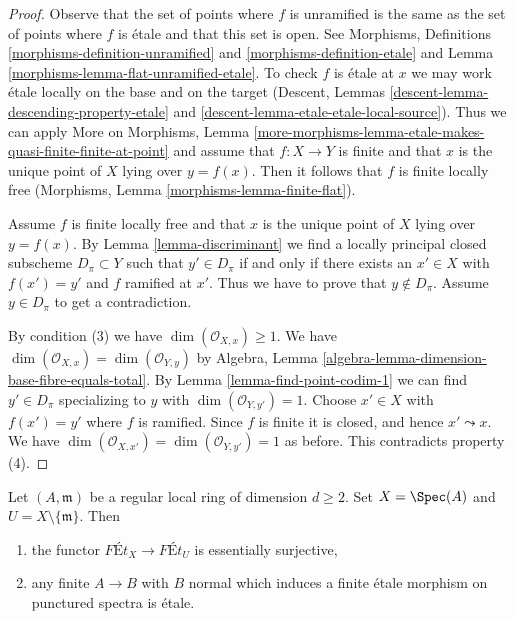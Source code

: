 \begin{proof}
Observe that the set of points where $f$ is unramified is the same as
the set of points where $f$ is \'etale and that this set is open.
See Morphisms, Definitions \ref{morphisms-definition-unramified}
and \ref{morphisms-definition-etale} and
Lemma \ref{morphisms-lemma-flat-unramified-etale}.
To check $f$ is \'etale at $x$ we may work \'etale
locally on the base and on the
target (Descent, Lemmas \ref{descent-lemma-descending-property-etale} and
\ref{descent-lemma-etale-etale-local-source}).
Thus we can apply More on Morphisms, Lemma
\ref{more-morphisms-lemma-etale-makes-quasi-finite-finite-at-point}
and assume that $f : X \to Y$ is finite and that $x$ is the unique
point of $X$ lying over $y = f(x)$.
Then it follows that $f$ is finite locally free
(Morphisms, Lemma \ref{morphisms-lemma-finite-flat}).

\medskip\noindent
Assume $f$ is finite locally free and that $x$ is the unique point of
$X$ lying over $y = f(x)$. By Lemma \ref{lemma-discriminant}
we find a locally principal closed subscheme $D_\pi \subset Y$
such that $y' \in D_\pi$ if and only if there exists an $x' \in X$
with $f(x') = y'$ and $f$ ramified at $x'$. Thus we have to prove
that $y \not \in D_\pi$. Assume $y \in D_\pi$ to get a contradiction.

\medskip\noindent
By condition (3) we have $\dim(\mathcal{O}_{X, x}) \geq 1$.
We have $\dim(\mathcal{O}_{X, x}) = \dim(\mathcal{O}_{Y, y})$ by
Algebra, Lemma \ref{algebra-lemma-dimension-base-fibre-equals-total}.
By Lemma \ref{lemma-find-point-codim-1}
we can find $y' \in D_\pi$ specializing to $y$
with $\dim(\mathcal{O}_{Y, y'}) = 1$.
Choose $x' \in X$ with $f(x') = y'$ where $f$ is ramified. Since $f$
is finite it is closed, and hence $x' \leadsto x$.
We have $\dim(\mathcal{O}_{X, x'}) = \dim(\mathcal{O}_{Y, y'}) = 1$
as before. This contradicts property (4).
\end{proof}

\begin{lemma}
\label{lemma-local-purity}
Let $(A, \mathfrak m)$ be a regular local ring of dimension $d \geq 2$.
Set $X = \Spec(A)$ and $U = X \setminus \{\mathfrak m\}$. Then
\begin{enumerate}
\item the functor $\textit{F\'Et}_X \to \textit{F\'Et}_U$
is essentially surjective,
\item any finite $A \to B$ with $B$ normal which
induces a finite \'etale morphism on punctured spectra is \'etale.
\end{enumerate}
\end{lemma}


